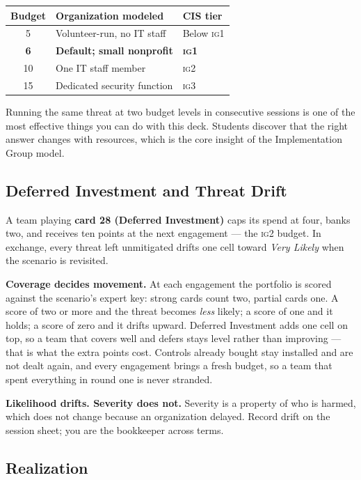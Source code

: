 \documentclass[11pt,letterpaper]{article}
\begin{document}
\begin{center}
\small
\begin{tabular}{@{}c l l@{}}
\toprule
\textbf{Budget} & \textbf{Organization modeled} & \textbf{CIS tier} \\
\midrule
5 & Volunteer-run, no IT staff & Below \textsc{ig1} \\
\textbf{6} & \textbf{Default; small nonprofit} & \textbf{\textsc{ig1}} \\
10 & One IT staff member & \textsc{ig2} \\
15 & Dedicated security function & \textsc{ig3} \\
\bottomrule
\end{tabular}
\end{center}

Running the same threat at two budget levels in consecutive sessions is one of
the most effective things you can do with this deck. Students discover that the
right answer changes with resources, which is the core insight of the
Implementation Group model.

\subsection{Deferred Investment and Threat Drift}

A team playing \textbf{card 28 (Deferred Investment)} caps its spend at four,
banks two, and receives ten points at the next engagement --- the \textsc{ig2}
budget. In exchange, every threat left unmitigated drifts one cell toward
\emph{Very Likely} when the scenario is revisited.

\textbf{Coverage decides movement.} At each engagement the portfolio is scored
against the scenario's expert key: strong cards count two, partial cards one. A
score of two or more and the threat becomes \emph{less} likely; a score of one
and it holds; a score of zero and it drifts upward. Deferred Investment adds one
cell on top, so a team that covers well and defers stays level rather than
improving --- that is what the extra points cost. Controls already bought stay
installed and are not dealt again, and every engagement brings a fresh budget, so
a team that spent everything in round one is never stranded.

\textbf{Likelihood drifts. Severity does not.} Severity is a property of who is
harmed, which does not change because an organization delayed. Record drift on
the session sheet; you are the bookkeeper across terms.

\subsection{Realization}
\end{document}
